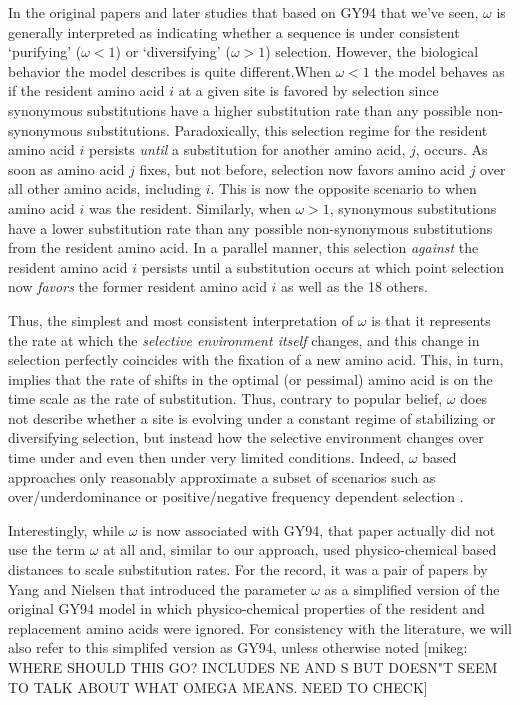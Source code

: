 \documentclass[12pt,letterpaper]{article}
\newcommand{\PC}{physico-chemical\xspace}
\begin{document}
{In the original papers \citep{GoldmanAndYang1994,YangAndNielsen1998,NielsenAndYang1998} and later studies that based on GY94 that we've seen, $\omega$ is generally interpreted as indicating whether a sequence is under consistent `purifying' ($\omega < 1$) or `diversifying' ($\omega > 1$) selection.
However, the biological behavior the model describes is quite different.When $\omega < 1$ the model behaves as if the resident amino acid $i$ at a given site is favored by selection since synonymous substitutions have a higher substitution rate than any possible non-synonymous substitutions.
Paradoxically, this selection regime for the resident amino acid $i$ persists \emph{until} a substitution for another amino acid, $j$, occurs.
As soon as amino acid $j$ fixes, but not before, selection now favors amino acid $j$ over all other amino acids, including $i$.
This is now the opposite scenario to when amino acid $i$ was the resident.
Similarly, when $\omega > 1$, synonymous substitutions have a lower substitution rate than any possible non-synonymous substitutions from the resident amino acid.
In a parallel manner, this selection \emph{against} the resident amino acid $i$ persists until a substitution occurs at which point selection now \emph{favors} the former resident amino acid $i$ as well as the 18 others.

Thus, the simplest and most consistent interpretation of $\omega$ is that it represents the rate at which the \emph{selective environment itself} changes, and this change in selection perfectly coincides with the fixation of a new amino acid.
This, in turn, implies that the rate of shifts in the optimal (or pessimal) amino acid is on the time scale as the rate of substitution.
Thus, contrary to popular belief,  $\omega$ does not describe whether a site is evolving under a constant regime of stabilizing or diversifying selection, but instead how the selective environment changes over time under and even then under very limited conditions.
Indeed, $\omega$ based approaches only reasonably approximate a subset of scenarios such as over/underdominance or positive/negative frequency dependent selection \citep{HughesAndNei1988,Nowak2006}.

Interestingly, while $\omega$ is now associated with GY94, that paper actually did not use the term $\omega$ at all and, similar to our approach, used \PC based distances to scale substitution rates.
For the record, it was a pair of papers by Yang and Nielsen \citep{NielsenAndYang1998,YangAndNielsen1998} that introduced the parameter $\omega$ as a simplified version of the original GY94 model in which \PC properties of the resident and replacement amino acids were ignored.
For consistency with the literature, we will also refer to this simplifed version as GY94, unless otherwise noted
[mikeg: WHERE SHOULD THIS GO? \citet{NielsenAndYang2003} INCLUDES NE AND S BUT DOESN"T SEEM TO TALK ABOUT WHAT OMEGA MEANS.
NEED TO CHECK]

}
\end{document}
